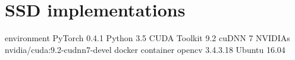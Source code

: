 \chapter{SSD implementations}
\label{app:impl}

environment
PyTorch 0.4.1
Python 3.5
CUDA Toolkit 9.2
cuDNN 7
NVIDIAs nvidia/cuda:9.2-cudnn7-devel docker container
opencv 3.4.3.18
Ubuntu 16.04
